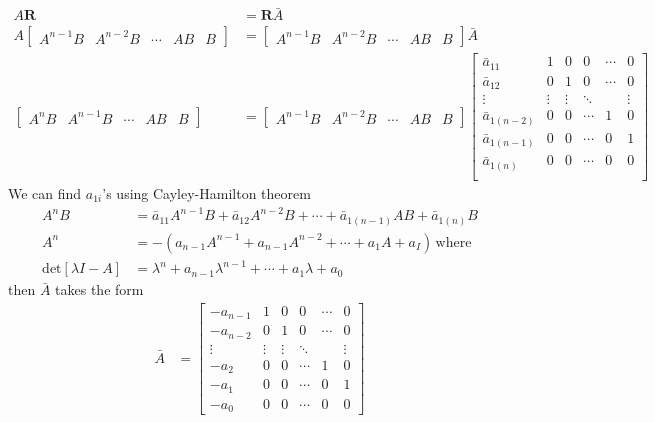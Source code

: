 \documentclass[twoside]{article}
\begin{document}
\begin{align*}
A \mathbf{R} &= \mathbf{R} \bar{A}
\\
A \left[ \begin{array}{c|c|c|c|c} A^{n-1} B & A^{n-2} B & \cdots & A B &  B \end{array} \right] &= \left[ \begin{array}{c|c|c|c|c} A^{n-1} B & A^{n-2} B & \cdots & A B &  B \end{array} \right] \bar{A}
\\
\left[ \begin{array}{c|c|c|c|c} A^{n} B & A^{n-1} B & \cdots & A B &  B \end{array} \right] &= \left[ \begin{array}{c|c|c|c|c} A^{n-1} B & A^{n-2} B & \cdots & A B &  B \end{array} \right] \left[ \begin{array}{c|c|c|c|c|c} 
\bar{a}_{11} & 1 & 0 & 0 & \cdots & 0 \\
\bar{a}_{12} & 0 & 1 &  0 & \cdots & 0 \\
\vdots & \vdots & \vdots & \ddots &  & \vdots \\
\bar{a}_{1(n-2)} & 0 & 0 & \cdots  & 1 & 0 \\
\bar{a}_{1(n-1)} & 0 & 0 & \cdots  & 0 & 1 \\
\bar{a}_{1(n)} & 0 & 0 & \cdots  & 0 & 0 \\
\end{array} 
\right] 
\end{align*}
%
We can find $a_{1i}$'s using Cayley-Hamilton theorem
%
\begin{align*}
A^{n} B &= \bar{a}_{11} A^{n-1} B + \bar{a}_{12} A^{n-2} B + \cdots + \bar{a}_{1(n-1)} A B + \bar{a}_{1(n)} B
\\
A^{n} &= - \left( a_{n-1} A^{n-1} + a_{n-1} A^{n-2} + \cdots + a_1 A + a_ I \right) \, \mathrm{where}
\\
\mathrm{det}[\lambda I - A] &= \lambda^n + a_{n-1}  \lambda^{n-1}
	+ \cdots + a_{1} \lambda + a_0
\end{align*}
then $\bar{A}$ takes the form
\begin{align*}
\bar{A} &= \left[ \begin{array}{c|c|c|c|c|c} 
-a_{n-1} & 1 & 0 & 0 & \cdots & 0 \\
-a_{n-2} & 0 & 1 &  0 & \cdots & 0 \\
\vdots & \vdots & \vdots & \ddots &  & \vdots \\
-a_{2} & 0 & 0 & \cdots  & 1 & 0 \\
-a_{1} & 0 & 0 & \cdots  & 0 & 1 \\
-a_{0} & 0 & 0 & \cdots  & 0 & 0 
\end{array} 
\right] 
\end{align*}
\end{document}
